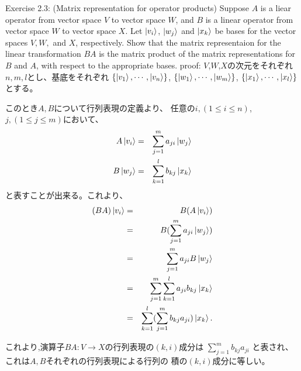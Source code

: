 \setcounter{equation}{0}
{\Large Exercise 2.3: (Matrix representation for operator products)}
\newline
Suppose $A$ is a liear operator from vector space $V$ to vector space $W$,
and $B$ is a linear operator from vector space $W$ to vector space $X$.
Let $\ket{v_i}$, $\ket{w_j}$ and $\ket{x_k}$ be bases 
for the vector spaces $V, W,$ and $X$, respectively.
\newline
Show that the matrix representaion for the linear transformation 
$BA$ is the matrix product of the matrix representations for $B$ and $A$, 
with respect to the appropriate bases.
\vspace{0.1in}
\newline
{\large proof:}
\newline
$V$,$W$,$X$の次元をそれぞれ$n, m, l$とし、基底をそれぞれ
$\{\ket{v_1}, \cdots, \ket{v_n}\}$,
$\{\ket{w_1}, \cdots, \ket{w_m}\}$,
$\{\ket{x_1}, \cdots, \ket{x_l}\}$とする。

このとき$A, B$について行列表現の定義より、
任意の$i, (1\leq i\leq n)$, $j, (1\leq j\leq m)$において、
\begin{eqnarray}
A\ket{v_i} &=& \sum_{j=1}^m a_{ji} \ket{w_j} \\
B\ket{w_j} &=& \sum_{k=1}^l b_{kj} \ket{x_k}
\end{eqnarray}
と表すことが出来る。これより、
\begin{eqnarray*}
(BA)\ket{v_i}
&=& B(A\ket{v_i}) \\
&=& B(\sum_{j=1}^m a_{ji} \ket{w_j}) \\
&=& \sum_{j=1}^m a_{ji} B\ket{w_j} \\
&=& \sum_{j=1}^m \sum_{k=1}^l a_{ji} b_{kj} \ket{x_k} \\
&=& \sum_{k=1}^l (\sum_{j=1}^m b_{kj} a_{ji}) \ket{x_k}.
\end{eqnarray*}

これより,演算子$BA:V \to X$の行列表現の$(k, i)$成分は
$\sum_{j=1}^m b_{kj} a_{ji}$ と表され、これは$A, B$それぞれの行列表現による行列の
積の$(k, i)$成分に等しい。
